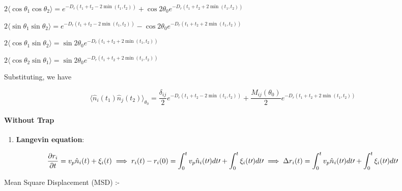 \documentclass[]{article}
\let\oldparagraph\paragraph
\renewcommand{\paragraph}[1]{\oldparagraph{#1}\mbox{}}
\begin{document}
\(2 \langle \cos \theta_1 \cos \theta_2 \rangle = e^{-D_r(t_1+t_2-2 \min(t_1,t_2))} + \cos 2\theta_0 e^{-D_r(t_1+t_2+2 \min(t_1,t_2))}\)

\(2 \langle \sin \theta_1 \sin \theta_2 \rangle = e^{-D_r(t_1+t_2-2 \min(t_1,t_2))} - \cos 2\theta_0 e^{-D_r(t_1+t_2+2 \min(t_1,t_2))}\)

\(2 \langle \cos \theta_1 \sin \theta_2 \rangle = \sin 2\theta_0 e^{-D_r(t_1+t_2+2 \min(t_1,t_2))} \)

\(2 \langle \cos \theta_2 \sin \theta_1 \rangle = \sin 2\theta_0 e^{-D_r(t_1+t_2+2 \min(t_1,t_2))} \)

Substituting, we have

\[\langle \hat n_i (t_1) \hat n_j (t_2) \rangle_{\theta_0} = \frac{\delta_{ij}}{2}e^{-D_r(t_1+t_2-2 \min(t_1,t_2))}+\frac{M_{ij}(\theta_0)}{2}e^{-D_r(t_1+t_2+2 \min(t_1,t_2))}\]

\paragraph{\texorpdfstring{\textbf{Without
Trap}}{Without Trap}}\label{header-n20}

\begin{enumerate}
\def\labelenumi{\arabic{enumi}.}
\item
  \textbf{Langevin equation}:
\end{enumerate}

\[\frac{\partial r_i }{\partial t}=  v_p \hat n_i (t) + \xi _i(t)
 \\\implies r_i(t) -r_i(0) =\int_0^tv_p \hat n_i(t\prime) dt\prime +\int_0^t \xi_i(t\prime)dt\prime
\\ \implies \Delta r_i(t)= \int_0^tv_p \hat n_i(t\prime) dt\prime +\int_0^t \xi_i(t\prime)dt\prime\]

Mean Square Displacement (MSD) :-
\end{document}
